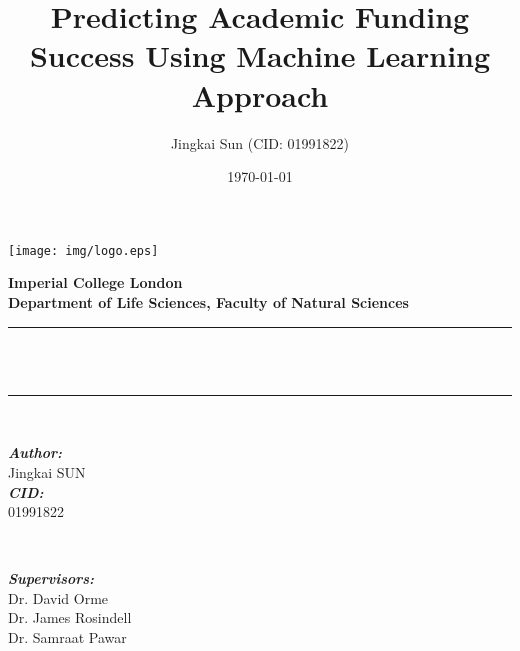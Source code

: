 \documentclass[11pt]{article}
\title{Predicting Academic Funding Success Using Machine Learning Approach}
\author{Jingkai Sun (CID: 01991822)}
\date{\today}
\begin{document}
\begin{titlepage}

    \newcommand{\HRule}{\rule{\linewidth}{0.5mm}} %


    \texttt{[image: img/logo.eps]}\\[1cm]


    \center %


    \textbf{\large Imperial College London}\\[0.8 cm] %
    \textbf{\large Department of Life Sciences, Faculty of Natural Sciences}\\[0.8 cm] %
    \makeatletter
    \HRule \\[0.6cm]
    { \huge \bfseries \@title}\\[0.6cm] %
    \HRule \\[1.5cm]

    \begin{minipage}{0.4\textwidth}
      \begin{flushleft} \large
      \emph{\textbf{Author:}}\\
      Jingkai \textsc{SUN} \\[0.5cm]
      \emph{\textbf{CID:}}\\
      01991822
      \end{flushleft}
      \end{minipage}
      ~
    \begin{minipage}{0.5\textwidth}
      \begin{flushright} \large
      \emph{\textbf{Supervisors:}} \\
      Dr. David Orme \\
      Dr. James Rosindell \\
      Dr. Samraat Pawar \\


\end{flushright}
\end{minipage}
\end{titlepage}
\end{document}
